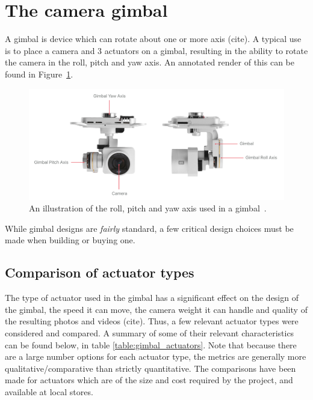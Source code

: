 \section{The camera gimbal}
A gimbal is device which can rotate about one or more axis {\color{red} (cite)}. A typical use is to place a camera and 3 actuators on a gimbal, resulting in the ability to rotate the camera in the roll, pitch and yaw axis. An annotated render of this can be found in Figure~\ref{fig:roll_pitch_yaw_camera}.

\begin{figure}[h!]
  \centering
  \includegraphics[width=\textwidth]{literature_review/roll_pitch_yaw_gimbal.png}
  \caption{\label{fig:roll_pitch_yaw_camera} An illustration of the roll, pitch and yaw axis used in a gimbal~\cite{roll_pitch_yaw_camera}.}
\end{figure}

While gimbal designs are \emph{fairly} standard, a few critical design choices must be made when building or buying one.%

\subsection{Comparison of actuator types}
The type of actuator used in the gimbal has a significant effect on the design of the gimbal, the speed it can move, the camera weight it can handle and quality of the resulting photos and videos {\color{red} (cite)}. Thus, a few relevant actuator types were considered and compared. A summary of some of their relevant characteristics can be found below, in table \ref{table:gimbal_actuators}. Note that because there are a large number options for each actuator type, the metrics are generally more qualitative/comparative than strictly quantitative. The comparisons have been made for actuators which are of the size and cost required by the project, and available at local stores.

